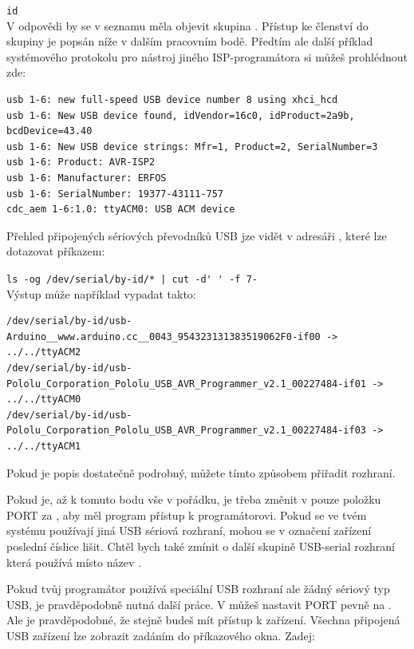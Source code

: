 \verb"id"\\
V odpovědi by se v seznamu měla objevit skupina  .
Přístup ke členství do skupiny je popsán níže v dalším pracovním bodě.
Předtím ale další příklad systémového protokolu pro nástroj jiného
ISP-programátora   si můžeš prohlédnout zde: 
\vspace*{-.5em}
\begin{footnotesize} \begin{verbatim}
usb 1-6: new full-speed USB device number 8 using xhci_hcd
usb 1-6: New USB device found, idVendor=16c0, idProduct=2a9b, bcdDevice=43.40
usb 1-6: New USB device strings: Mfr=1, Product=2, SerialNumber=3
usb 1-6: Product: AVR-ISP2
usb 1-6: Manufacturer: ERFOS
usb 1-6: SerialNumber: 19377-43111-757
cdc_aem 1-6:1.0: ttyACM0: USB ACM device
\end{verbatim} \end{footnotesize}
\vspace*{-.5em}
Přehled připojených sériových převodníků USB jze vidět v adresáři ,
které lze dotazovat příkazem:

\verb"ls -og /dev/serial/by-id/* | cut -d' ' -f 7-"\\ 
Výstup může například vypadat takto:
\vspace*{-.2em} 
\begin{footnotesize} \begin{verbatim}
/dev/serial/by-id/usb-Arduino__www.arduino.cc__0043_954323131383519062F0-if00 -> ../../ttyACM2
/dev/serial/by-id/usb-Pololu_Corporation_Pololu_USB_AVR_Programmer_v2.1_00227484-if01 -> ../../ttyACM0
/dev/serial/by-id/usb-Pololu_Corporation_Pololu_USB_AVR_Programmer_v2.1_00227484-if03 -> ../../ttyACM1
\end{verbatim} \end{footnotesize}
\vspace*{-.2em}
Pokud je popis dostatečně podrobný, můžete tímto způsobem přiřadit rozhraní.

Pokud je, až k tomuto bodu vše v pořádku, je třeba změnit v  pouze položku PORT 
za ,
aby měl program  přístup k programátorovi.
Pokud se ve tvém systému používají jiná USB sériová rozhraní, mohou se v označení zařízení poslední číslice lišit.
Chtěl bych také zmínit o další skupině USB-serial rozhraní která používá místo  název .

Pokud tvůj programátor používá speciální USB rozhraní ale
žádný sériový typ USB, je pravděpodobně nutná další práce. V  můžeš nastavit PORT pevně na . 
Ale je pravděpodobné, že stejně budeš mít přístup k zařízení.
Všechna připojená USB zařízení lze zobrazit zadáním  do příkazového okna. Zadej:

